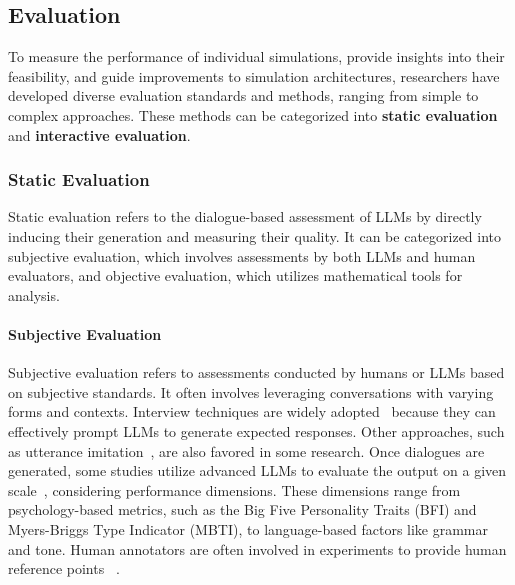 \subsection{Evaluation}\label{subsec:indi_eval}


To measure the performance of individual simulations, provide insights into their feasibility, and guide improvements to simulation architectures, researchers have developed diverse evaluation standards and methods, ranging from simple to complex approaches. These methods can be categorized into \textbf{static evaluation} and \textbf{interactive evaluation}.

\subsubsection{Static Evaluation}

Static evaluation refers to the dialogue-based assessment of LLMs by directly inducing their generation and measuring their quality. It can be categorized into subjective evaluation, which involves assessments by both LLMs and human evaluators, and objective evaluation, which utilizes mathematical tools for analysis.

\paragraph{Subjective Evaluation} Subjective evaluation refers to assessments conducted by humans or LLMs based on subjective standards. It often involves leveraging conversations with varying forms and contexts. Interview techniques are widely adopted~\cite{wang2024rolellmbenchmarkingelicitingenhancing,wang2024incharacterevaluatingpersonalityfidelity} because they can effectively prompt LLMs to generate expected responses. Other approaches, such as utterance imitation~\cite{deshpande2023toxicitychatgptanalyzingpersonaassigned}, are also favored in some research. Once dialogues are generated, some studies utilize advanced LLMs to evaluate the output on a given scale~\cite{wang2024incharacterevaluatingpersonalityfidelity,li2024personalllmagentsinsights,yu2024neekoleveragingdynamiclora}, considering performance dimensions. These dimensions range from psychology-based metrics, such as the Big Five Personality Traits (BFI) and Myers-Briggs Type Indicator (MBTI), to language-based factors like grammar and tone. Human annotators are often involved in experiments to provide human reference points ~\cite{park2023generativeagentsinteractivesimulacra,abbasian2024conversationalhealthagentspersonalized,baek2024knowledgeaugmentedlargelanguagemodels}.
\par
